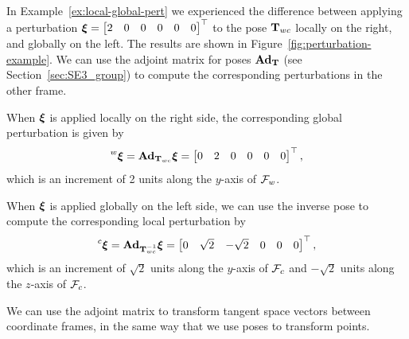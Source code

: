 \begin{example}[frametitle=Computing global from local and vice versa]
In Example~\ref{ex:local-global-pert} we experienced the difference between applying a perturbation ${\boldsymbol{\mathbf{\xi}}} = \begin{bmatrix}2 & 0 & 0 & 0 & 0 & 0\end{bmatrix}^{\top}$ to the pose ${\boldsymbol{\mathbf{T}}}_{wc}$ locally on the right, and globally on the left.
The results are shown in Figure~\ref{fig:perturbation-example}.
We can use the adjoint matrix for poses $\boldsymbol{\mathbf{Ad}}_{\boldsymbol{\mathbf{T}}}$ (see Section~\ref{sec:SE3_group}) to compute the corresponding perturbations in the other frame.

When ${\boldsymbol{\mathbf{\xi}}}$ is applied locally on the right side, the corresponding global perturbation is given by
\begin{equation}
  \prescript{w}{}{{\boldsymbol{\mathbf{\xi}}}} =
  \boldsymbol{\mathbf{Ad}}_{{\boldsymbol{\mathbf{T}}}_{wc}} {\boldsymbol{\mathbf{\xi}}} = 
  \begin{bmatrix} 0 & 2 & 0 & 0 & 0 & 0 \end{bmatrix}^{\top},
\end{equation}
which is an increment of 2 units along the $y$-axis of $\mathcal{F}_w$.

When ${\boldsymbol{\mathbf{\xi}}}$ is applied globally on the left side, we can use the inverse pose to compute the corresponding local perturbation by
\begin{equation}
  \prescript{c}{}{{\boldsymbol{\mathbf{\xi}}}} =
  \boldsymbol{\mathbf{Ad}}_{{\boldsymbol{\mathbf{T}}}_{wc}^{-1}} {\boldsymbol{\mathbf{\xi}}} = 
  \begin{bmatrix} 0 & \sqrt{2} & -\sqrt{2} & 0 & 0 & 0 \end{bmatrix}^{\top},
\end{equation}
which is an increment of $\sqrt{2}$ units along the $y$-axis of $\mathcal{F}_c$ and $-\sqrt{2}$ units along the $z$-axis of $\mathcal{F}_c$.

We can use the adjoint matrix to transform tangent space vectors between coordinate frames, in the same way that we use poses to transform points.
\end{example}

